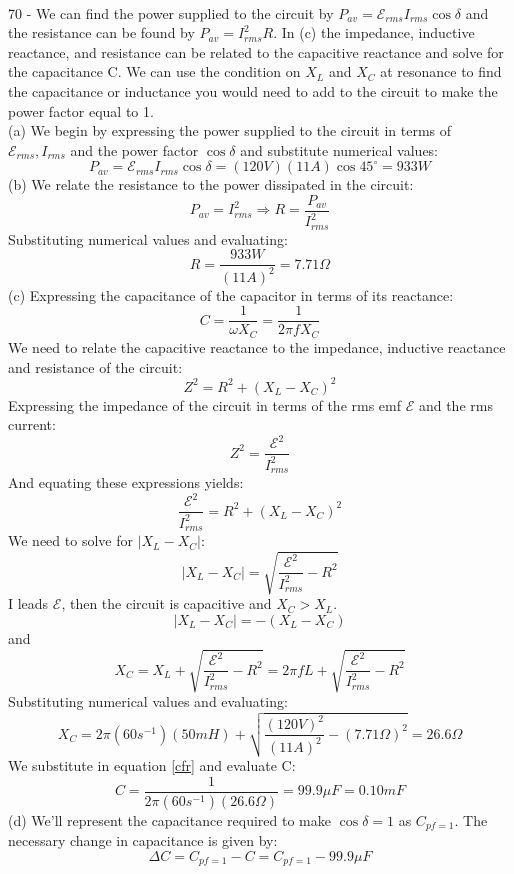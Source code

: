 \documentclass{report}
\begin{document}
\paragraph{}
70 - We can find the power supplied to the circuit by $P_{av} = \mathcal{E}_{rms}I_{rms}\cos \delta$ and the resistance can be found by $P_{av} = I_{rms}^2R$. In (c) the impedance, inductive reactance, and resistance can be related to the capacitive reactance and solve for the capacitance C. We can use the condition on $X_L$ and $X_C$ at resonance to find the capacitance or inductance you would need to add to the circuit to make the power factor equal to 1.\\
(a) We begin by expressing the power supplied to the circuit in terms of $\mathcal{E}_{rms}, I_{rms}$ and the power factor $\cos \delta$ and substitute numerical values:
$$P_{av} = \mathcal{E}_{rms}I_{rms} \cos \delta = (120 V)(11 A) \cos 45^{\circ} = 933 W$$
(b) We relate the resistance to the power dissipated in the circuit:
$$P_{av} = I_{rms}^2 \Rightarrow R = \frac{P_{av}}{I_{rms}^2}$$
Substituting numerical values and evaluating:
$$R = \frac{933 W}{(11 A)^2} = 7.71 \Omega$$
(c) Expressing the capacitance of the capacitor in terms of its reactance:
\begin{equation}\label{cfr}
  C = \frac{1}{\omega X_C} = \frac{1}{2 \pi f X_C}
\end{equation}
We need to relate the capacitive reactance to the impedance, inductive reactance and resistance of the circuit:
$$Z^2 = R^2 + (X_L - X_C)^2$$
Expressing the impedance of the circuit in terms of the rms emf $\mathcal{E}$ and the rms current:
$$Z^2 = \frac{\mathcal{E}^2}{I_{rms}^2}$$
And equating these expressions yields:
$$\frac{\mathcal{E}^2}{I_{rms}^2} = R^2 + (X_L -X_C)^2$$
We need to solve for $\lvert X_L - X_C \rvert$:
$$\lvert X_L - X_C \rvert = \sqrt{\frac{\mathcal{E}^2}{I_{rms}^2} - R^2}$$
I leads $\mathcal{E}$, then the circuit is capacitive and $X_C > X_L$.
$$\lvert X_L - X_C \rvert = -(X_L - X_C)$$
and
$$X_C = X_L + \sqrt{\frac{\mathcal{E}^2}{I_{rms}^2} - R^2} = 2 \pi fL + \sqrt{\frac{\mathcal{E}^2}{I_{rms}^2} - R^2}$$
Substituting numerical values and evaluating:
$$X_C = 2 \pi (60s^{-1})(50 mH) + \sqrt{\frac{(120 V)^2}{(11 A)^2} - (7.71 \Omega)^2} = 26.6 \Omega$$
We substitute in equation \ref{cfr} and evaluate C:
$$C = \frac{1}{2 \pi (60s^{-1})(26.6 \Omega)} = 99.9 \mu F = 0.10 mF$$
(d) We'll represent the capacitance required to make $\cos \delta = 1$ as $C_{pf = 1}$. The necessary change in capacitance is given by:
$$\Delta C = C_{pf = 1} - C = C_{pf = 1} - 99.9 \mu F$$
\end{document}
